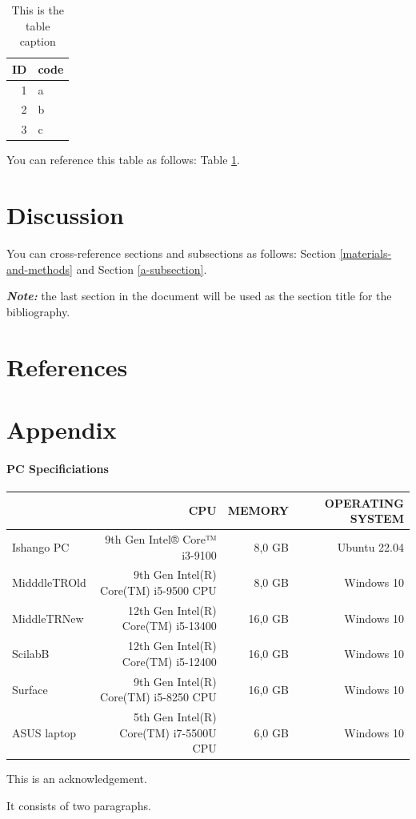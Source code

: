 \documentclass[12pt,halfline,a4paper,]{ouparticle}
\begin{document}
\begin{table}

\caption{\label{tab:tab2}This is the table caption}
\centering
\begin{tabular}[t]{rl}
\toprule
ID & code\\
\midrule
1 & a\\
2 & b\\
3 & c\\
\bottomrule
\end{tabular}
\end{table}

You can reference this table as follows: Table \ref{tab:tab2}.

\section{Discussion}\label{discussion}

You can cross-reference sections and subsections as follows: Section
\ref{materials-and-methods} and Section \ref{a-subsection}.

\textbf{\emph{Note:}} the last section in the document will be used as
the section title for the bibliography.

\section{References}\label{references}

\section{Appendix}\label{appendix}

\paragraph{PC Specificiations}\label{pc-specificiations}

\hfill\break

\begin{tabular}{l|r|r|r}
\hline
  & CPU & MEMORY & OPERATING SYSTEM\\
\hline
Ishango PC &  9th Gen Intel® Core™ i3-9100  & 8,0 GB &  Ubuntu 22.04\\
\hline
MidddleTROld & 9th Gen Intel(R) Core(TM) i5-9500 CPU & 8,0 GB &  Windows 10\\
\hline
MiddleTRNew & 12th Gen Intel(R) Core(TM) i5-13400 & 16,0 GB &  Windows 10\\
\hline
ScilabB &  12th Gen Intel(R) Core(TM) i5-12400 &  16,0 GB  &  Windows 10\\
\hline
Surface &  9th Gen Intel(R) Core(TM) i5-8250 CPU &  16,0 GB  &  Windows 10\\
\hline
ASUS laptop &  5th Gen Intel(R) Core(TM) i7-5500U CPU &  6,0 GB  &  Windows 10\\
\end{tabular}

\hfill\break


\begin{notes}[Acknowledgements]
This is an acknowledgement.

It consists of two paragraphs.
\end{notes}
\end{document}
